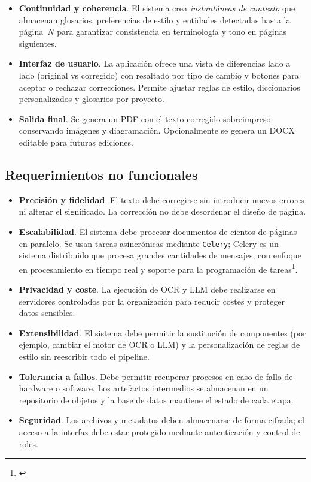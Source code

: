 \documentclass[12pt]{article}
\newcommand{\tcite}[1]{\footnote{\textnormal{\detokenize{#1}}}}
\begin{document}
\begin{itemize}
  \item \textbf{Continuidad y coherencia}. El sistema crea \emph{instantáneas de contexto} que almacenan
        glosarios, preferencias de estilo y entidades detectadas hasta la página \(N\) para garantizar
        consistencia en terminología y tono en páginas siguientes.

  \item \textbf{Interfaz de usuario}. La aplicación ofrece una vista de diferencias lado a lado
        (original vs corregido) con resaltado por tipo de cambio y botones para aceptar o
        rechazar correcciones.  Permite ajustar reglas de estilo, diccionarios personalizados y
        glosarios por proyecto.

  \item \textbf{Salida final}. Se genera un PDF con el texto corregido sobreimpreso conservando
        imágenes y diagramación.  Opcionalmente se genera un DOCX editable para futuras ediciones.
\end{itemize}

\subsection{Requerimientos no funcionales}

\begin{itemize}
  \item \textbf{Precisión y fidelidad}.  El texto debe corregirse sin introducir nuevos errores ni
        alterar el significado.  La corrección no debe desordenar el diseño de página.

  \item \textbf{Escalabilidad}.  El sistema debe procesar documentos de cientos de páginas en
        paralelo.  Se usan tareas asincrónicas mediante \texttt{Celery}; Celery es un sistema
        distribuido que procesa grandes cantidades de mensajes, con enfoque en procesamiento en
        tiempo real y soporte para la programación de tareas\tcite{【227726339796927†L13-L19】}.

  \item \textbf{Privacidad y coste}.  La ejecución de OCR y LLM debe realizarse en servidores
        controlados por la organización para reducir costes y proteger datos sensibles.

  \item \textbf{Extensibilidad}.  El sistema debe permitir la sustitución de componentes (por
        ejemplo, cambiar el motor de OCR o LLM) y la personalización de reglas de estilo sin
        reescribir todo el pipeline.

  \item \textbf{Tolerancia a fallos}.  Debe permitir recuperar procesos en caso de fallo de
        hardware o software.  Los artefactos intermedios se almacenan en un repositorio de objetos
        y la base de datos mantiene el estado de cada etapa.

  \item \textbf{Seguridad}.  Los archivos y metadatos deben almacenarse de forma cifrada; el
        acceso a la interfaz debe estar protegido mediante autenticación y control de roles.
\end{itemize}
\end{document}
